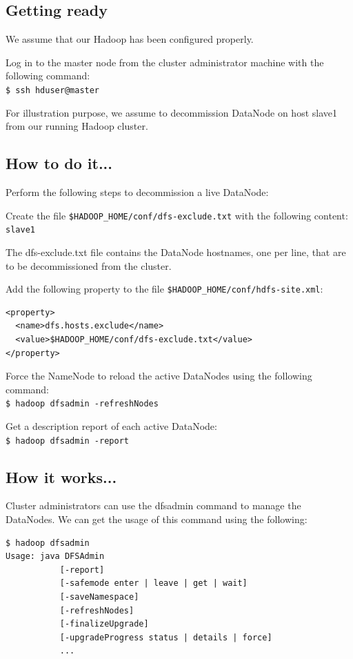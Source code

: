 \subsection*{Getting ready}
We assume that our Hadoop has been configured properly.

Log in to the master node from the cluster administrator machine with the following command: \\
\verb|$ ssh hduser@master|

For illustration purpose, we assume to decommission DataNode on host slave1 from our running Hadoop cluster.
\subsection*{How to do it...}
Perform the following steps to decommission a live DataNode:

Create the file \verb|$HADOOP_HOME/conf/dfs-exclude.txt| with the following content:\\
\verb|slave1|

The dfs-exclude.txt file contains the DataNode hostnames, one per line, that are to be decommissioned from the cluster.

Add the following property to the file \verb|$HADOOP_HOME/conf/hdfs-site.xml|:
\begin{verbatim}
<property>
  <name>dfs.hosts.exclude</name>
  <value>$HADOOP_HOME/conf/dfs-exclude.txt</value>
</property>
\end{verbatim}

Force the NameNode to reload the active DataNodes using the following command: \\
\verb|$ hadoop dfsadmin -refreshNodes|

Get a description report of each active DataNode: \\
\verb|$ hadoop dfsadmin -report|

\subsection*{How it works...}
Cluster administrators can use the dfsadmin command to manage the DataNodes. We can get the usage of this command using the following:
\begin{verbatim}
$ hadoop dfsadmin
Usage: java DFSAdmin
           [-report]
           [-safemode enter | leave | get | wait]
           [-saveNamespace]
           [-refreshNodes]
           [-finalizeUpgrade]
           [-upgradeProgress status | details | force]
           ...
\end{verbatim}
